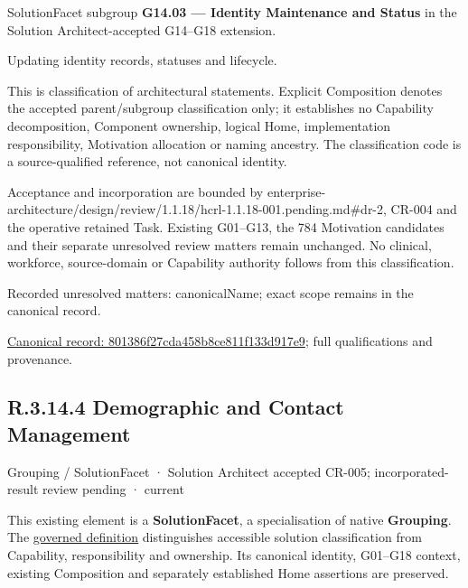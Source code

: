 SolutionFacet subgroup \textbf{G14.03 — Identity Maintenance and Status} in the Solution Architect-accepted G14–G18 extension.



Updating identity records, statuses and lifecycle.



This is classification of architectural statements. Explicit Composition denotes the accepted parent/subgroup classification only; it establishes no Capability decomposition, Component ownership, logical Home, implementation responsibility, Motivation allocation or naming ancestry. The classification code is a source-qualified reference, not canonical identity.



Acceptance and incorporation are bounded by enterprise-architecture/design/review/1.1.18/hcrl-1.1.18-001.pending.md\#dr-2, CR-004 and the operative retained Task. Existing G01–G13, the 784 Motivation candidates and their separate unresolved review matters remain unchanged. No clinical, workforce, source-domain or Capability authority follows from this classification.


{\small Recorded unresolved matters: canonicalName; exact scope remains in the canonical record.}\par
{\footnotesize \href{../../../../../../../continuum/grouping/801386f27cda458b8ce811f133d917e9.md}{Canonical record: 801386f27cda458b8ce811f133d917e9}; full qualifications and provenance.}\par
\subsection*{R.3.14.4 Demographic and Contact Management}
\label{navigation:R.3.14.4}

\label{element:58c5443983854dd98cd72f2dd795c063}
{\small Grouping / SolutionFacet · Solution Architect accepted CR-005; incorporated-result review pending · current}\par

This existing element is a \textbf{SolutionFacet}, a specialisation of native
\textbf{Grouping}. The \href{\detokenize{../../../../../../../governance/continuum-representation.md#solutionfacet-classification--1119-candidate}}{governed definition}
distinguishes accessible solution classification from Capability, responsibility
and ownership. Its canonical identity, G01–G18 context, existing Composition
and separately established Home assertions are preserved.



